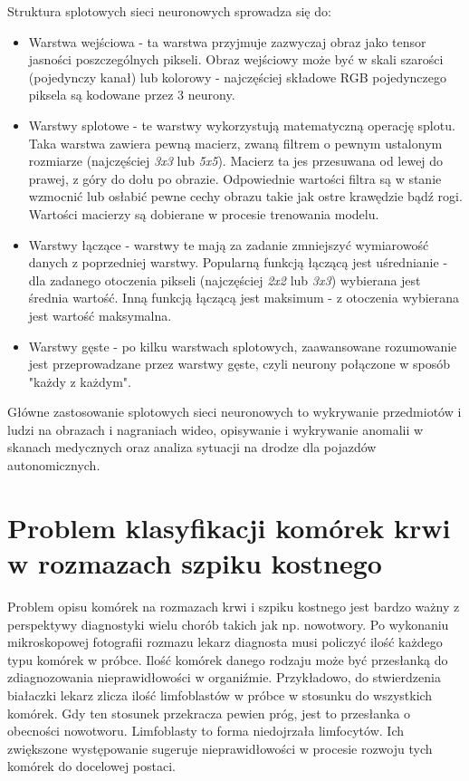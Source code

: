Struktura splotowych sieci neuronowych sprowadza się do:
\begin{itemize}
    \item Warstwa wejściowa - ta warstwa przyjmuje zazwyczaj obraz jako tensor jasności poszczególnych pikseli.
    Obraz wejściowy może być w skali szarości (pojedynczy kanał) lub kolorowy - najczęściej składowe RGB pojedynczego piksela są kodowane przez 3 neurony.
    \item Warstwy splotowe - te warstwy wykorzystują matematyczną operację splotu.
    Taka warstwa zawiera pewną macierz, zwaną filtrem o pewnym ustalonym rozmiarze (najczęściej \textit{3x3} lub \textit{5x5}).
    Macierz ta jes przesuwana od lewej do prawej, z góry do dołu po obrazie.
    Odpowiednie wartości filtra są w stanie wzmocnić lub osłabić pewne cechy obrazu takie jak ostre krawędzie bądź rogi.
    Wartości macierzy są dobierane w procesie trenowania modelu.
    \item Warstwy łączące - warstwy te mają za zadanie zmniejszyć wymiarowość danych z poprzedniej warstwy.
    Popularną funkcją łączącą jest uśrednianie - dla zadanego otoczenia pikseli (najczęściej \textit{2x2} lub \textit{3x3}) wybierana jest średnia wartość.
    Inną funkcją łączącą jest maksimum - z otoczenia wybierana jest wartość maksymalna.
    \item Warstwy gęste - po kilku warstwach splotowych, zaawansowane rozumowanie jest przeprowadzane przez warstwy gęste, czyli neurony połączone w sposób "każdy z każdym".
\end{itemize}

Główne zastosowanie splotowych sieci neuronowych to wykrywanie przedmiotów i ludzi na obrazach i nagraniach wideo,
opisywanie i wykrywanie anomalii w skanach medycznych oraz analiza sytuacji na drodze dla pojazdów autonomicznych.


\section{Problem klasyfikacji komórek krwi w rozmazach szpiku kostnego}

Problem opisu komórek na rozmazach krwi i szpiku kostnego jest bardzo ważny z perspektywy diagnostyki wielu chorób takich jak np.
nowotwory.
Po wykonaniu mikroskopowej fotografii rozmazu lekarz diagnosta musi policzyć ilość każdego typu komórek w próbce.
Ilość komórek danego rodzaju może być przesłanką do zdiagnozowania nieprawidłowości w organiźmie.
Przykładowo, do stwierdzenia białaczki lekarz zlicza ilość limfoblastów w próbce w stosunku do wszystkich komórek.
Gdy ten stosunek przekracza pewien próg, jest to przesłanka o obecności nowotworu.
Limfoblasty to forma niedojrzała limfocytów.
Ich zwiększone występowanie sugeruje nieprawidłowości w procesie rozwoju tych komórek do docelowej postaci.

